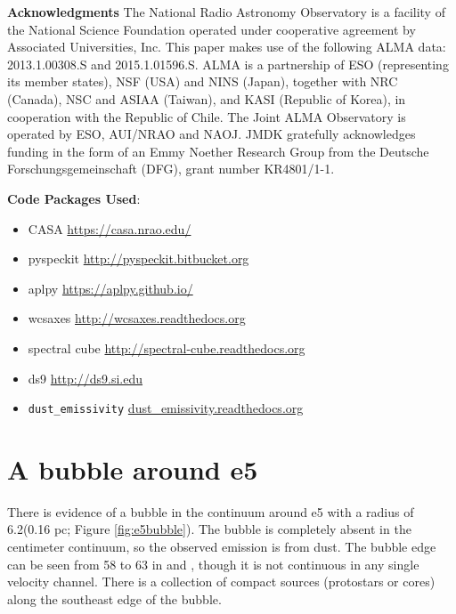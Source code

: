\documentclass{aa}
\begin{document}
\textbf{Acknowledgments}
The National Radio Astronomy Observatory is a facility of the National Science
Foundation operated under cooperative agreement by Associated Universities,
Inc.
This paper makes use of the following ALMA data: 2013.1.00308.S 
and 2015.1.01596.S.
ALMA is a partnership of ESO (representing its member states), NSF (USA) and
NINS (Japan), together with NRC (Canada), NSC and ASIAA (Taiwan), and KASI
(Republic of Korea), in cooperation with the Republic of Chile. The Joint ALMA
Observatory is operated by ESO, AUI/NRAO and NAOJ.
JMDK gratefully acknowledges funding in the form of an
Emmy Noether Research Group from the Deutsche Forschungsgemeinschaft (DFG),
grant number KR4801/1-1.

\textbf{Code Packages Used}:

\begin{itemize}
    \item CASA \url{https://casa.nrao.edu/}
    \item pyspeckit \url{http://pyspeckit.bitbucket.org} \citet{Ginsburg2011c}
    \item aplpy \url{https://aplpy.github.io/}
    \item wcsaxes \url{http://wcsaxes.readthedocs.org}
    \item spectral cube \url{http://spectral-cube.readthedocs.org}
    \item ds9 \url{http://ds9.si.edu}
    \item \texttt{dust\_emissivity} \url{dust_emissivity.readthedocs.org}
\end{itemize}




\appendix

\section{A bubble around e5}
\label{sec:e5bubble}
There is evidence of a bubble in the continuum around e5 with a radius of
6.2\arcsec (0.16 pc; Figure \ref{fig:e5bubble}).  The bubble is completely
absent in the centimeter continuum, so the observed emission is from dust.  The
bubble edge can be seen from 58 \kms to 63 \kms in \ceighteeno and
\formaldehyde, though it is not continuous in any single velocity channel.
There is a collection of compact sources (protostars or cores) along the
southeast edge of the bubble.
\end{document}
